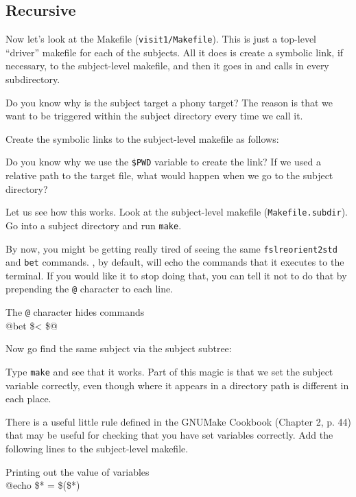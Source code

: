 \subsection{Recursive \maken{}}
Now let's look at the Makefile (\texttt{visit1/Makefile}).  This is just a 
top-level ``driver'' makefile for each of the subjects. All it does is
create a symbolic link, if necessary, to the subject-level makefile,
and then it goes in and calls \maken{} in every subdirectory.

Do you know why is the subject target a phony target? The reason is
that we want \maken{} to be triggered within the subject directory every
time we call it.

Create the symbolic links to the subject-level makefile as follows:

Do you know why we use the \texttt{\$PWD} variable to create the link?
If we used a relative path to the target file, what would happen when
we go to the subject directory?

Let us see how this works. Look at the subject-level makefile (\texttt{Makefile.subdir}). Go into
a subject directory and run \texttt{make}.

By now, you might be getting really tired of seeing the same \texttt{fslreorient2std} and \texttt{bet} commands. \maken{}, by default,
will echo the commands that it executes to the terminal. If you would
like it to stop doing that, you can tell it not to do that by
prepending the \texttt{@} character to each line.
\begin{make}{The \texttt{@} character hides commands}{}
\\
  \tab @bet \$< \$@
\end{make}

Now go find the same subject via the subject subtree:

Type \texttt{make} and see that it works. Part of this magic is that we set
the subject variable correctly, even though where it appears in a
directory path is different in each place.

There is a useful little rule defined in the GNUMake Cookbook (Chapter
2, p. 44) that may be useful for checking that you have set variables correctly. Add the following lines to the subject-level makefile.


\begin{make}{Printing out the value of variables}{}
\\
\tab @echo \$* = \$(\$*)
\end{make}

